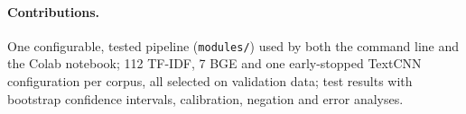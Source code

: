 \paragraph{Contributions.} One configurable, tested pipeline (\texttt{modules/}) used by both the command line and the Colab notebook; 112 TF-IDF, 7 BGE and one early-stopped TextCNN configuration per corpus, all selected on validation data; test results with bootstrap confidence intervals, calibration, negation and error analyses.
